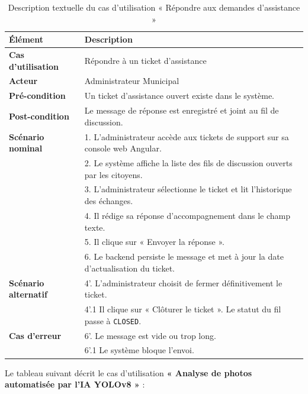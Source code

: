 \begin{table}[H]
    \centering
    \caption{Description textuelle du cas d'utilisation « Répondre aux demandes d’assistance »}
    \label{tab:txt_reply_ticket}
    \vspace{0.2cm}
    \small
    \begin{tabularx}{\textwidth}{|l|X|}
        \hline
        \textbf{Élément} & \textbf{Description} \\ \hline
        \textbf{Cas d’utilisation} & Répondre à un ticket d'assistance \\ \hline
        \textbf{Acteur} & Administrateur Municipal \\ \hline
        \textbf{Pré-condition} & Un ticket d'assistance ouvert existe dans le système. \\ \hline
        \textbf{Post-condition} & Le message de réponse est enregistré et joint au fil de discussion. \\ \hline
        \textbf{Scénario nominal} &
        1. L'administrateur accède aux tickets de support sur sa console web Angular.\\
        & 2. Le système affiche la liste des fils de discussion ouverts par les citoyens.\\
        & 3. L'administrateur sélectionne le ticket et lit l'historique des échanges.\\
        & 4. Il rédige sa réponse d'accompagnement dans le champ texte.\\
        & 5. Il clique sur « Envoyer la réponse ».\\
        & 6. Le backend persiste le message et met à jour la date d'actualisation du ticket. \\ \hline
        \textbf{Scénario alternatif} &
        4'. L'administrateur choisit de fermer définitivement le ticket.\\
        & 4'.1 Il clique sur « Clôturer le ticket ». Le statut du fil passe à \texttt{CLOSED}. \\ \hline
        \textbf{Cas d’erreur} &
        6'. Le message est vide ou trop long.\\
        & 6'.1 Le système bloque l'envoi. \\ \hline
    \end{tabularx}
\end{table}

Le tableau suivant décrit le cas d'utilisation \textbf{« Analyse de photos automatisée par l'IA YOLOv8 »} :

